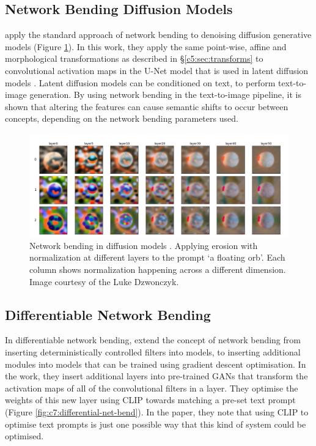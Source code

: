  \subsection{Network Bending Diffusion Models}
 \label{c7:subsec:netbend-diffusion}

 \cite{dzwonczyk2024network} apply the standard approach of network bending to denoising diffusion generative models (Figure \ref{fig:c7:net-bend-diffusion}).
 In this work, they apply the same point-wise, affine and morphological transformations as described in \S \ref{c5:sec:transforms} to convolutional activation maps in the U-Net model \citep{ronneberger2015u} that is used in latent diffusion models \citep{rombach2022high}. 
 Latent diffusion models can be conditioned on text, to perform text-to-image generation.
 By using network bending in the text-to-image pipeline, it is shown that altering the features can cause semantic shifts to occur between concepts, depending on the network bending parameters used.

\begin{figure}[!htb]
    \centering
    \captionsetup{justification=centering}
    \includegraphics[width=1\textwidth]{figures/c7_impact/net-bend-technical/net-bend-diffusion.png}
    \caption[Network bending in diffusion models]{Network bending in diffusion models \citep{dzwonczyk2024network}. Applying erosion with normalization at different layers to the prompt `a floating orb'. Each column shows normalization happening across a different dimension. Image courtesy of the Luke Dzwonczyk.}
    \label{fig:c7:net-bend-diffusion}
\end{figure}

\subsection{Differentiable Network Bending}

In differentiable network bending, \cite{aldegheri2023hacking} extend the concept of network bending from inserting deterministically controlled filters into models, to inserting additional modules into models that can be trained using gradient descent optimisation.
In the work, they insert additional layers into pre-trained GANs that transform the activation maps of all of the convolutional filters in a layer.
They optimise the weights of this new layer using CLIP \citep{radford2021learning} towards matching a pre-set text prompt (Figure \ref{fig:c7:differential-net-bend}).
In the paper, they note that using CLIP to optimise text prompts is just one possible way that this kind of system could be optimised. 

